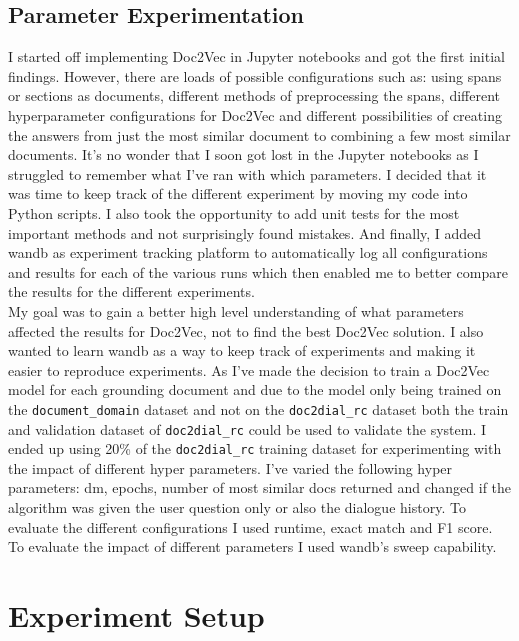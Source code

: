 \documentclass[11pt]{article}
\begin{document}
    \subsection{Parameter Experimentation}\label{subsec:experimentation-method}
    I started off implementing Doc2Vec in Jupyter notebooks and got the first initial findings. However, there are loads
    of possible configurations such as: using spans or sections as documents, different methods of preprocessing the spans, different
    hyperparameter configurations for Doc2Vec and different possibilities of creating the answers from just the most similar
    document to combining a few most similar documents. It's no wonder that I soon got lost in the Jupyter notebooks as
    I struggled to remember what I've ran with which parameters. I decided
     that it was time to keep track of the different experiment by moving my code into Python scripts. I also took
    the opportunity to add unit tests for the most important methods and not surprisingly found mistakes. And
    finally, I added wandb as experiment tracking platform to automatically log all configurations and results for each of
    the various runs \cite{wandb} which then enabled me to better compare the results for the different experiments.\\

    My goal was to gain a better high level understanding of what parameters affected the results for Doc2Vec, not to
    find the best Doc2Vec solution. I also wanted to learn wandb as a way to keep track of experiments and making it easier
    to reproduce experiments. As I've made the decision to train a Doc2Vec model for each grounding document and
    due to the model only being trained on the \texttt{document\_domain} dataset and not on the
    \texttt{doc2dial\_rc} dataset both the train and validation dataset of \texttt{doc2dial\_rc} could be used to validate the system.
    I ended up using 20\% of the \texttt{doc2dial\_rc} training dataset for experimenting with the
    impact of different hyper parameters. I've varied the following hyper parameters: dm, epochs, number of most similar docs returned and changed
    if the algorithm was given the user question only or also the dialogue history. To evaluate the different configurations
    I used runtime, exact match and F1 score. To evaluate the impact of different parameters I used wandb's sweep capability.


    \section{Experiment Setup}\label{sec:experiment-setup}
\end{document}
